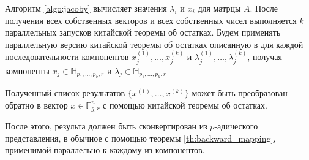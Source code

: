 \documentclass[master, och, diploma, times]{sty/SCWorks}
\theoremstyle{plain}
\theoremstyle{definition}
\begin{document}
Алгоритм \ref{algo:jacoby} вычисляет значения $\lambda_i$ и $x_i$ для матрцы $A$. После получения всех собственных векторов и всех собственных чисел выполняется $k$ параллельных запусков китайской теоремы об остатках. Будем применять параллельную версию китайской теоремы об остатках описанную в \cite{bib:numbers:limongelli} для каждой последовательности компонентов $x_j^{(1)}, \dots, x_j^{(k)}$ и $\lambda_j^{(1)}, \dots, \lambda_j^{(k)}$, получая компоненты $x_j \in \mathbb{H}_{p_1,\dots,p_k,r}$ и $\lambda_j \in \mathbb{H}_{p_1,\dots,p_k,r}$

Полученный список результатов $\{x^{(1)},\dots,x^{(k)}\}$ может быть преобразован обратно в вектор $x \in \mathbb{F}_{g,r}^n$ с помощью китайской теоремы об остатках.

После этого, результа должен быть сконвертирован из $p$-адического представления, в обычное с помощью теоремы \ref{th:backward_mapping}, применимой параллельно к каждому из компонентов.
\end{document}
